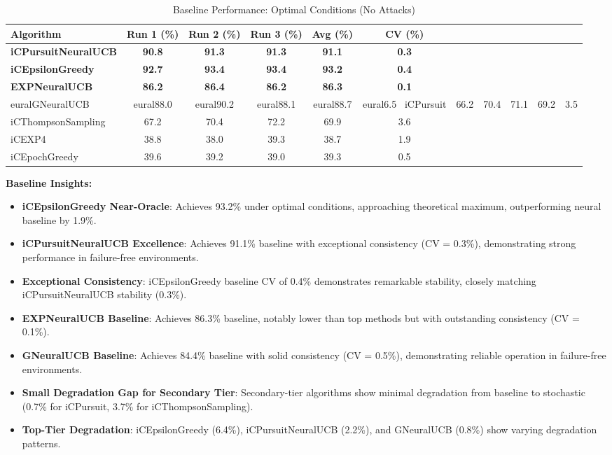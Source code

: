 \documentclass[12pt,a4paper]{article}
\newcommand{\primarytext}[1]{\textcolor{primaryblue}{\textbf{#1}}}
\newcommand{\secondarytext}[1]{\textcolor{secondaryblue}{\textbf{#1}}}
\newcommand{\warning}[1]{\textcolor{warningred}{\textbf{#1}}}
\newcommand{\legacy}[1]{\textcolor{legacycolor}{\textbf{#1}}}
\newcommand{\neural}[1]{\textcolor{neuralcolor}{\textbf{#1}}}
\begin{document}
\begin{table}[H]
\centering
\caption{Baseline Performance: Optimal Conditions (No Attacks)}
\label{tab:baseline-performance}
\begin{tabular}{@{}lccccc@{}}
\toprule
\textbf{Algorithm} & \textbf{Run 1 (\%)} & \textbf{Run 2 (\%)} & \textbf{Run 3 (\%)} & \textbf{Avg (\%)} & \textbf{CV (\%)} \\
\midrule
\neural{iCPursuitNeuralUCB}   & \neural{90.8} & \neural{91.3} & \neural{91.3} & \neural{91.1} & \neural{0.3} \\
\primarytext{iCEpsilonGreedy}   & \primarytext{92.7} & \primarytext{93.4} & \primarytext{93.4} & \primarytext{93.2} & \primarytext{0.4} \\
\legacy{EXPNeuralUCB}           & \legacy{86.2} & \legacy{86.4} & \legacy{86.2} & \legacy{86.3} & \legacy{0.1} \\

eural{GNeuralUCB}            & 
eural{88.0} & 
eural{90.2} & 
eural{88.1} & 
eural{88.7} & 
eural{6.5} \
iCPursuit                       & 66.2 & 70.4 & 71.1 & 69.2 & 3.5 \\
iCThompsonSampling              & 67.2 & 70.4 & 72.2 & 69.9 & 3.6 \\
iCEXP4                          & 38.8 & 38.0 & 39.3 & 38.7 & 1.9 \\
iCEpochGreedy                   & 39.6 & 39.2 & 39.0 & 39.3 & 0.5 \\
\bottomrule
\end{tabular}
\end{table}

\textbf{Baseline Insights:}
\begin{itemize}
\item \primarytext{iCEpsilonGreedy Near-Oracle}: Achieves 93.2\% under optimal conditions, approaching theoretical maximum, outperforming neural baseline by 1.9\%.
\item \neural{iCPursuitNeuralUCB Excellence}: Achieves 91.1\% baseline with exceptional consistency (CV = 0.3\%), demonstrating strong performance in failure-free environments.
\item \primarytext{Exceptional Consistency}: iCEpsilonGreedy baseline CV of 0.4\% demonstrates remarkable stability, closely matching iCPursuitNeuralUCB stability (0.3\%).
\item \legacy{EXPNeuralUCB Baseline}: Achieves 86.3\% baseline, notably lower than top methods but with outstanding consistency (CV = 0.1\%).
\item \neural{GNeuralUCB Baseline}: Achieves 84.4\% baseline with solid consistency (CV = 0.5\%), demonstrating reliable operation in failure-free environments.
\item \secondarytext{Small Degradation Gap for Secondary Tier}: Secondary-tier algorithms show minimal degradation from baseline to stochastic (0.7\% for iCPursuit, 3.7\% for iCThompsonSampling).
\item \warning{Top-Tier Degradation}: iCEpsilonGreedy (6.4\%), iCPursuitNeuralUCB (2.2\%), and GNeuralUCB (0.8\%) show varying degradation patterns.
\end{itemize}
\end{document}
